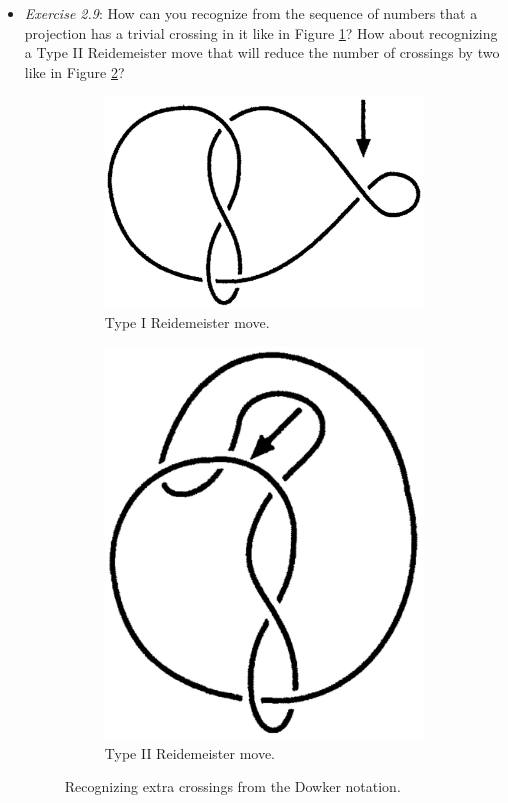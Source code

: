 \documentclass[titlepage]{article}
\numberwithin{figure}{section}
\numberwithin{table}{section}
\numberwithin{equation}{section}
\begin{document}
\begin{itemize}
\begin{itemize}
    \end{itemize}
    \item \emph{Exercise 2.9}: How can you recognize from the sequence of numbers that a projection has a trivial crossing in it like in Figure \ref{fig:ex2-9a}? How about recognizing a Type II Reidemeister move that will reduce the number of crossings by two like in Figure \ref{fig:ex2-9b}?
    \begin{figure}[h!]
        \centering
        \begin{subfigure}[b]{0.3\linewidth}
            \centering
            \includegraphics[width=0.6\linewidth]{Blender/ex2-9a.png}
            \caption{Type I Reidemeister move.}
            \label{fig:ex2-9a}
        \end{subfigure}
        \begin{subfigure}[b]{0.3\linewidth}
            \centering
            \includegraphics[width=0.53\linewidth]{Blender/ex2-9b.png}
            \caption{Type II Reidemeister move.}
            \label{fig:ex2-9b}
        \end{subfigure}
        \caption{Recognizing extra crossings from the Dowker notation.}
        \label{fig:ex2-9}
    \end{figure}

\end{itemize}
\end{document}
